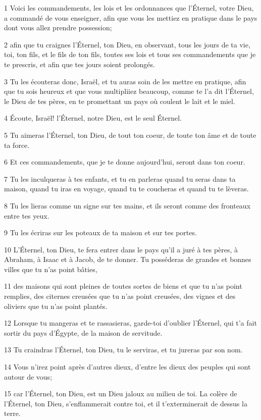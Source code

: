 \par 1 Voici les commandements, les lois et les ordonnances que l'Éternel, votre Dieu, a commandé de vous enseigner, afin que vous les mettiez en pratique dans le pays dont vous allez prendre possession;
\par 2 afin que tu craignes l'Éternel, ton Dieu, en observant, tous les jours de ta vie, toi, ton fils, et le fils de ton fils, toutes ses lois et tous ses commandements que je te prescris, et afin que tes jours soient prolongés.
\par 3 Tu les écouteras donc, Israël, et tu auras soin de les mettre en pratique, afin que tu sois heureux et que vous multipliiez beaucoup, comme te l'a dit l'Éternel, le Dieu de tes pères, en te promettant un pays où coulent le lait et le miel.
\par 4 Écoute, Israël! l'Éternel, notre Dieu, est le seul Éternel.
\par 5 Tu aimeras l'Éternel, ton Dieu, de tout ton coeur, de toute ton âme et de toute ta force.
\par 6 Et ces commandements, que je te donne aujourd'hui, seront dans ton coeur.
\par 7 Tu les inculqueras à tes enfants, et tu en parleras quand tu seras dans ta maison, quand tu iras en voyage, quand tu te coucheras et quand tu te lèveras.
\par 8 Tu les lieras comme un signe sur tes mains, et ils seront comme des fronteaux entre tes yeux.
\par 9 Tu les écriras sur les poteaux de ta maison et sur tes portes.
\par 10 L'Éternel, ton Dieu, te fera entrer dans le pays qu'il a juré à tes pères, à Abraham, à Isaac et à Jacob, de te donner. Tu posséderas de grandes et bonnes villes que tu n'as point bâties,
\par 11 des maisons qui sont pleines de toutes sortes de biens et que tu n'as point remplies, des citernes creusées que tu n'as point creusées, des vignes et des oliviers que tu n'as point plantés.
\par 12 Lorsque tu mangeras et te rassasieras, garde-toi d'oublier l'Éternel, qui t'a fait sortir du pays d'Égypte, de la maison de servitude.
\par 13 Tu craindras l'Éternel, ton Dieu, tu le serviras, et tu jureras par son nom.
\par 14 Vous n'irez point après d'autres dieux, d'entre les dieux des peuples qui sont autour de vous;
\par 15 car l'Éternel, ton Dieu, est un Dieu jaloux au milieu de toi. La colère de l'Éternel, ton Dieu, s'enflammerait contre toi, et il t'exterminerait de dessus la terre.
